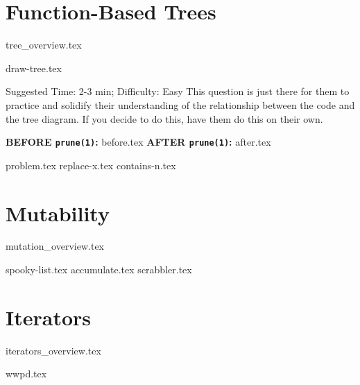 \documentclass{exam}
\begin{document}
\section{Function-Based Trees}
{tree_overview.tex}
\begin{questions}
    {draw-tree.tex}
    \begin{questionmeta}
        Suggested Time: 2-3 min; Difficulty: Easy
        This question is just there for them to practice and solidify their understanding of the relationship between the code and the tree diagram. 
        If you decide to do this, have them do this on their own.
    \end{questionmeta}
    \newpage
    \begin{blocksection} 
        \textbf{BEFORE \lstinline{prune(1)}:}
        {before.tex}
        \hspace{0.5in}
        \textbf{AFTER \lstinline{prune(1)}:}
        {after.tex}
    \end{blocksection}
    {problem.tex}
    {replace-x.tex} 
    {contains-n.tex}
\end{questions}

\newpage
    
\section{Mutability}
{mutation_overview.tex}
\begin{questions}
    {spooky-list.tex}
    {accumulate.tex}
    \newpage
    {scrabbler.tex}
\end{questions}

\section{Iterators}
{iterators_overview.tex}
\begin{questions}
    {wwpd.tex}
\end{questions}
\end{document}
